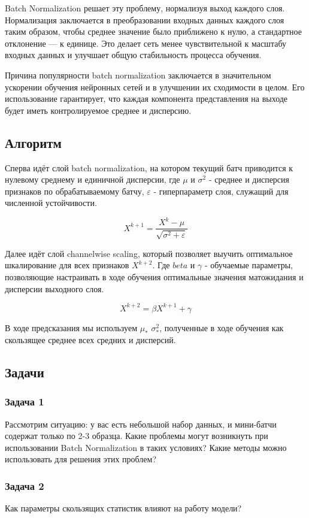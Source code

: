 Batch Normalization решает эту проблему, нормализуя выход каждого слоя. Нормализация заключается в преобразовании входных данных каждого слоя таким образом, чтобы среднее значение было приближено к нулю, а стандартное отклонение — к единице. Это делает сеть менее чувствительной к масштабу входных данных и улучшает общую стабильность процесса обучения.

Причина популярности batch normalization заключается в значительном ускорении обучения нейронных сетей и в улучшении их сходимости в целом. Его использование гарантирует, что каждая компонента представления на выходе будет иметь контролируемое среднее и дисперсию.

\subsection{Алгоритм}
Сперва идёт слой batch normalization, на котором текущий батч приводится к нулевому среднему и единичной дисперсии, где $\mu$ и $\sigma^2$ - среднее и дисперсия признаков по обрабатываемому батчу, $\varepsilon$ - гиперпараметр слоя, служащий для численной устойчивости.

\[X^{k+1} = \frac{X^k - \mu}{\sqrt{\sigma^2 + \varepsilon}}\]

Далее идёт слой channelwise scaling, который позволяет выучить оптимальное шкалирование для всех признаков $X^{k+2}$. Где $beta$ и $\gamma$ - обучаемые параметры, позволяющие настраивать в ходе обучения оптимальные значения матожидания и дисперсии выходного слоя.

\[X^{k+2} = \beta X^{k+1} + \gamma \]

В ходе предсказания мы используем $\mu_*$ $\sigma_*^2$, полученные в ходе обучения как скользящее среднее всех средних и дисперсий.

\subsection{Задачи}

\subsubsection*{Задача 1}
Рассмотрим ситуацию: у вас есть небольшой набор данных, и мини-батчи содержат только по 2-3 образца. Какие проблемы могут возникнуть при использовании Batch Normalization в таких условиях? Какие методы можно использовать для решения этих проблем?

\subsubsection*{Задача 2}
Как параметры скользящих статистик влияют на работу модели?

